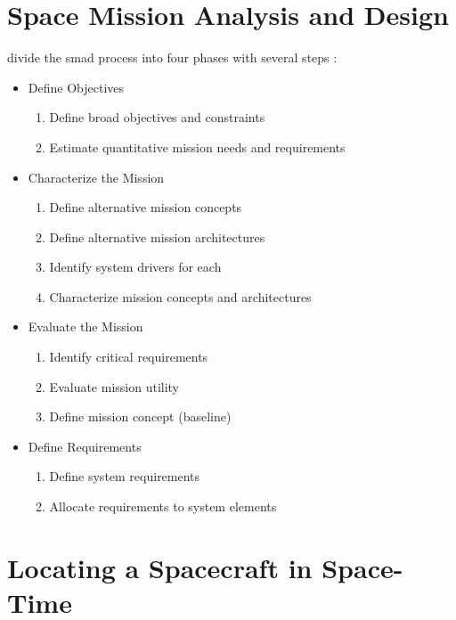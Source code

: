 \section{Space Mission Analysis and Design}
\label{sec:space-mission-analysis-and-design}
\citeauthor{wertz-space-1999} divide the \ac{smad} process into four phases with several steps \autocite[p. 2]{wertz-space-1999}:
\begin{itemize}
    \item Define Objectives
        \begin{enumerate}
            \item Define broad objectives and constraints
            \item Estimate quantitative mission needs and requirements
        \end{enumerate}
    \item Characterize the Mission
        \begin{enumerate}[start=3]
            \item Define alternative mission concepts
            \item Define alternative mission architectures
            \item Identify system drivers for each
            \item Characterize mission concepts and architectures
        \end{enumerate}
    \item Evaluate the Mission
        \begin{enumerate}[start=7]
            \item Identify critical requirements
            \item Evaluate mission utility
            \item Define mission concept (baseline)
        \end{enumerate}
    \item Define Requirements
        \begin{enumerate}[start=10]
            \item Define system requirements
            \item Allocate requirements to system elements
        \end{enumerate}
\end{itemize}

\section{Locating a Spacecraft in Space-Time}
